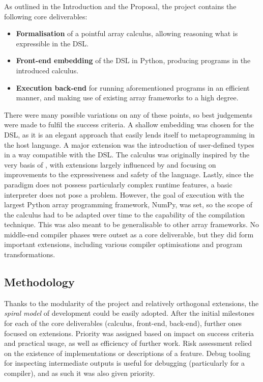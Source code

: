 As outlined in the Introduction and the Proposal, the project contains the following core deliverables:
\begin{itemize}
    \item \textbf{Formalisation} of a pointful array calculus, allowing reasoning what is expressible in the DSL.
    \item \textbf{Front-end embedding} of the DSL in Python, producing programs in the introduced calculus.
    \item \textbf{Execution back-end} for running aforementioned programs in an efficient manner, and making use of existing array frameworks to a high degree.
\end{itemize}
There were many possible variations on any of these points, so best judgements were made to fulfil the success criteria. A shallow embedding was chosen for the DSL, as it is an elegant approach that easily lends itself to metaprogramming in the host language. A major extension was the introduction of user-defined types in a way compatible with the DSL. The calculus was originally inspired by the very basis of \textcite{paszke2021getting}, with extensions largely influenced by \textcite{shaikhha2019efficient} and focusing on improvements to the expressiveness and safety of the language. Lastly, since the paradigm does not possess particularly complex runtime features, a basic interpreter does not pose a problem. However, the goal of execution with the largest Python array programming framework, NumPy, was set, so the scope of the calculus had to be adapted over time to the capability of the compilation technique. This was also meant to be generalisable to other array frameworks. No middle-end compiler phases were outset as a core deliverable, but they did form important extensions, including various compiler optimisations and program transformations.

\subsection{Methodology}

 Thanks to the modularity of the project and relatively orthogonal extensions, the \textit{spiral model} of development could be easily adopted. After the initial milestones for each of the core deliverables (calculus, front-end, back-end), further ones focused on extensions. Priority was assigned based on impact on success criteria and practical usage, as well as efficiency of further work. Risk assessment relied on the existence of implementations or descriptions of a feature. Debug tooling for inspecting intermediate outputs is useful for debugging (particularly for a compiler), and as such it was also given priority.

